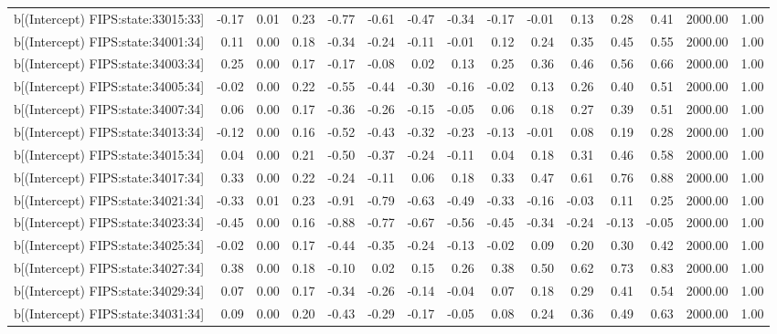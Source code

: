 \begin{table}[ht]
\begin{tabular}{rrrrrrrrrrrrrrr}
  b[(Intercept) FIPS:state:33015:33] & -0.17 & 0.01 & 0.23 & -0.77 & -0.61 & -0.47 & -0.34 & -0.17 & -0.01 & 0.13 & 0.28 & 0.41 & 2000.00 & 1.00 \\ 
  b[(Intercept) FIPS:state:34001:34] & 0.11 & 0.00 & 0.18 & -0.34 & -0.24 & -0.11 & -0.01 & 0.12 & 0.24 & 0.35 & 0.45 & 0.55 & 2000.00 & 1.00 \\ 
  b[(Intercept) FIPS:state:34003:34] & 0.25 & 0.00 & 0.17 & -0.17 & -0.08 & 0.02 & 0.13 & 0.25 & 0.36 & 0.46 & 0.56 & 0.66 & 2000.00 & 1.00 \\ 
  b[(Intercept) FIPS:state:34005:34] & -0.02 & 0.00 & 0.22 & -0.55 & -0.44 & -0.30 & -0.16 & -0.02 & 0.13 & 0.26 & 0.40 & 0.51 & 2000.00 & 1.00 \\ 
  b[(Intercept) FIPS:state:34007:34] & 0.06 & 0.00 & 0.17 & -0.36 & -0.26 & -0.15 & -0.05 & 0.06 & 0.18 & 0.27 & 0.39 & 0.51 & 2000.00 & 1.00 \\ 
  b[(Intercept) FIPS:state:34013:34] & -0.12 & 0.00 & 0.16 & -0.52 & -0.43 & -0.32 & -0.23 & -0.13 & -0.01 & 0.08 & 0.19 & 0.28 & 2000.00 & 1.00 \\ 
  b[(Intercept) FIPS:state:34015:34] & 0.04 & 0.00 & 0.21 & -0.50 & -0.37 & -0.24 & -0.11 & 0.04 & 0.18 & 0.31 & 0.46 & 0.58 & 2000.00 & 1.00 \\ 
  b[(Intercept) FIPS:state:34017:34] & 0.33 & 0.00 & 0.22 & -0.24 & -0.11 & 0.06 & 0.18 & 0.33 & 0.47 & 0.61 & 0.76 & 0.88 & 2000.00 & 1.00 \\ 
  b[(Intercept) FIPS:state:34021:34] & -0.33 & 0.01 & 0.23 & -0.91 & -0.79 & -0.63 & -0.49 & -0.33 & -0.16 & -0.03 & 0.11 & 0.25 & 2000.00 & 1.00 \\ 
  b[(Intercept) FIPS:state:34023:34] & -0.45 & 0.00 & 0.16 & -0.88 & -0.77 & -0.67 & -0.56 & -0.45 & -0.34 & -0.24 & -0.13 & -0.05 & 2000.00 & 1.00 \\ 
  b[(Intercept) FIPS:state:34025:34] & -0.02 & 0.00 & 0.17 & -0.44 & -0.35 & -0.24 & -0.13 & -0.02 & 0.09 & 0.20 & 0.30 & 0.42 & 2000.00 & 1.00 \\ 
  b[(Intercept) FIPS:state:34027:34] & 0.38 & 0.00 & 0.18 & -0.10 & 0.02 & 0.15 & 0.26 & 0.38 & 0.50 & 0.62 & 0.73 & 0.83 & 2000.00 & 1.00 \\ 
  b[(Intercept) FIPS:state:34029:34] & 0.07 & 0.00 & 0.17 & -0.34 & -0.26 & -0.14 & -0.04 & 0.07 & 0.18 & 0.29 & 0.41 & 0.54 & 2000.00 & 1.00 \\ 
  b[(Intercept) FIPS:state:34031:34] & 0.09 & 0.00 & 0.20 & -0.43 & -0.29 & -0.17 & -0.05 & 0.08 & 0.24 & 0.36 & 0.49 & 0.63 & 2000.00 & 1.00 \\ 

\end{tabular}
\end{table}
